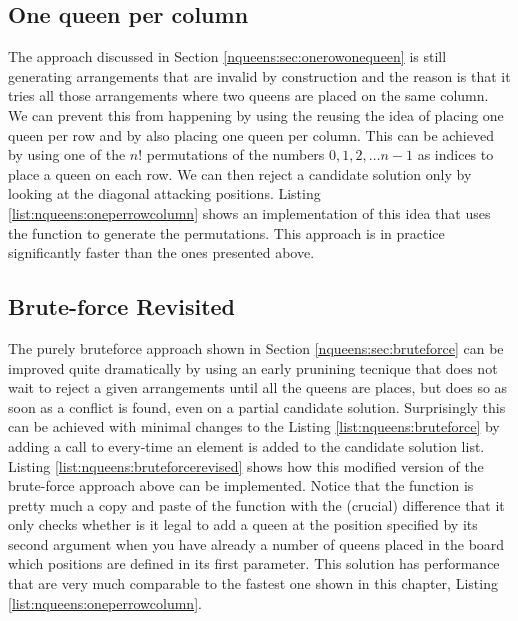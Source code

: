 \subsection{One queen per column}
\label{nqueens:sec:onequeenpercolumn}
The approach discussed in Section \ref{nqueens:sec:onerowonequeen} is still 
generating arrangements that are invalid by construction and the reason is that
it tries all those arrangements where two queens are placed on the same column. 
We can prevent this from happening by using the  reusing the idea of placing one queen per row
and by also placing one queen per column. This can be achieved by using 
one of the $n!$ permutations of the numbers  $0,1,2,\ldots n-1$ as indices to place a queen on each row.
We can then reject a candidate solution only by looking at the diagonal attacking positions. 
Listing \ref{list:nqueens:oneperrowcolumn} shows an implementation of this idea that uses the 
 function to generate the permutations.
This approach is in practice significantly faster than the ones presented above.





\subsection{Brute-force Revisited}
\label{nqueens:sec:bruteforcerevisited}
The purely bruteforce approach shown in Section \ref{nqueens:sec:bruteforce} can be improved quite dramatically by using an early prunining tecnique that
does not wait to reject a given arrangements until all the queens are places, but does so as soon as a conflict is found, even on a partial candidate solution.
Surprisingly this can be achieved with minimal changes to the Listing \ref{list:nqueens:bruteforce} by adding a call to 
 every-time an element is added to the candidate solution list.
Listing \ref{list:nqueens:bruteforcerevised} shows how this modified version of the brute-force approach above can be implemented.
Notice that the function  is pretty much a copy and paste of the function  with the (crucial)
difference that it only checks whether is it legal to add a queen at the position specified by its second argument when you have already a number of queens placed in the board which positions are defined in its first parameter.
This solution has performance that are very much comparable to the fastest one shown in this chapter, Listing \ref{list:nqueens:oneperrowcolumn}.


